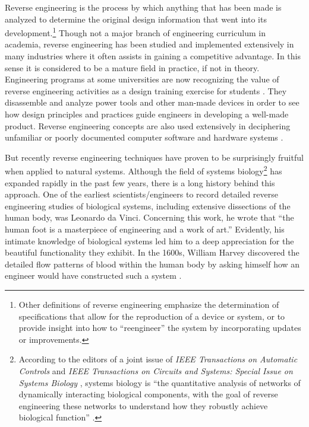 Reverse engineering is the process by which anything that has been made
is analyzed to determine the original design information that went into
its development.\footnote{
Other definitions of reverse engineering emphasize
the determination of specifications that allow for the reproduction of
a device or system, or to provide insight into how to “reengineer” the
system by incorporating updates or improvements.
} Though not a major branch of
engineering curriculum in academia, reverse engineering has been
studied and implemented extensively in many industries where it often
assists in gaining a competitive advantage. In this sense it is
considered to be a mature field in practice, if not in theory.
Engineering programs at some universities are now recognizing the value
of reverse engineering activities as a design training exercise for
students \citep[][pp. 57--59]{wu2008}.
They disassemble and analyze power tools
and other man-made devices in order to see how design principles and
practices guide engineers in developing a well-made product. Reverse
engineering concepts are also used extensively in deciphering
unfamiliar or poorly documented computer software and hardware
systems \citep{eilam2005}.

But recently reverse engineering techniques have proven to be
surprisingly fruitful when applied to natural systems. Although the
field of systems biology\footnote{
According to the editors of a joint issue of
\textit{IEEE Transactions on Automatic Controls} and \textit{IEEE
Transactions on Circuits and Systems: Special Issue on Systems Biology
}, systems biology is “the quantitative analysis of
networks of dynamically interacting biological components, with the
goal of reverse engineering these networks to understand how they
robustly achieve biological function” .
} has expanded rapidly in
the past few years, there is a long history behind this approach. One
of the earliest scientists/engineers to record detailed reverse
engineering studies of biological systems, including extensive
dissections of the human body, was Leonardo da Vinci. Concerning this
work, he wrote that “the human foot is a masterpiece of engineering and
a work of art.” Evidently, his intimate knowledge of biological systems
led him to a deep appreciation for the beautiful functionality they
exhibit. In the 1600s, William Harvey discovered the detailed flow
patterns of blood within the human body by asking himself how an
engineer would have constructed such a system \citep{auffraynoble2009}.


